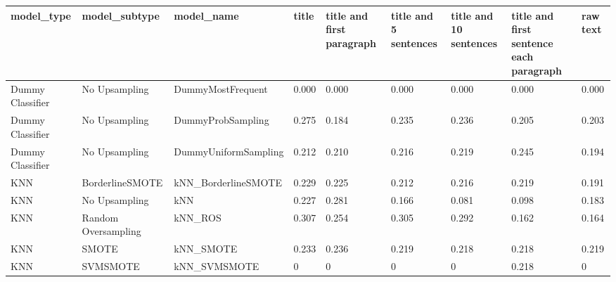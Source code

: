 \begin{tabular}{lllllllll}
\toprule
                  model\_type &       model\_subtype &                                   model\_name & title & title and first paragraph & title and 5 sentences & title and 10 sentences & title and first sentence each paragraph & raw text \\
\midrule
            Dummy Classifier &       No Upsampling &                            DummyMostFrequent & 0.000 &                     0.000 &                 0.000 &                  0.000 &                                   0.000 &    0.000 \\
            Dummy Classifier &       No Upsampling &                            DummyProbSampling & 0.275 &                     0.184 &                 0.235 &                  0.236 &                                   0.205 &    0.203 \\
            Dummy Classifier &       No Upsampling &                         DummyUniformSampling & 0.212 &                     0.210 &                 0.216 &                  0.219 &                                   0.245 &    0.194 \\
                         KNN &     BorderlineSMOTE &                          kNN\_BorderlineSMOTE & 0.229 &                     0.225 &                 0.212 &                  0.216 &                                   0.219 &    0.191 \\
                         KNN &       No Upsampling &                                          kNN & 0.227 &                     0.281 &                 0.166 &                  0.081 &                                   0.098 &    0.183 \\
                         KNN & Random Oversampling &                                      kNN\_ROS & 0.307 &                     0.254 &                 0.305 &                  0.292 &                                   0.162 &    0.164 \\
                         KNN &               SMOTE &                                    kNN\_SMOTE & 0.233 &                     0.236 &                 0.219 &                  0.218 &                                   0.218 &    0.219 \\
                         KNN &            SVMSMOTE &                                 kNN\_SVMSMOTE &     0 &                         0 &                     0 &                      0 &                                   0.218 &        0 \\

\end{tabular}
